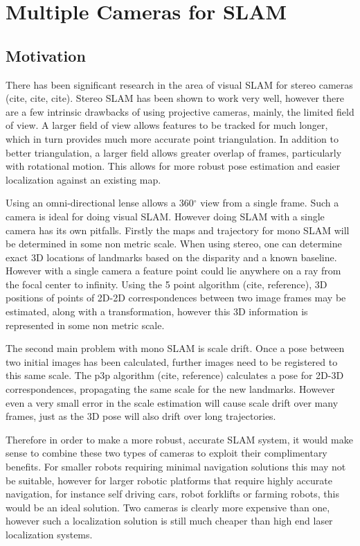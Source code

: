 \chapter{Multiple Cameras for SLAM}
\label{chapter:MultiCamSLAM}

\section{Motivation}

There has been significant research in the area of visual SLAM for stereo cameras (cite, cite, cite).  Stereo SLAM has been shown to work very well, however there are a few intrinsic drawbacks of using projective cameras, mainly, the limited field of view.  A larger field of view allows features to be tracked for much longer, which in turn provides much more accurate point triangulation.  In addition to better triangulation, a larger field allows greater overlap of frames, particularly with rotational motion.  This allows for more robust pose estimation and easier localization against an existing map. %

Using an omni-directional lense allows a 360$^{\circ}$ view from a single frame.  Such a camera is ideal for doing visual SLAM.  However doing SLAM with a single camera has its own pitfalls.  Firstly the maps and trajectory for mono SLAM will be determined in some non metric scale.  When using stereo, one can determine exact 3D locations of landmarks based on the disparity and a known baseline.  However with a single camera a feature point could lie anywhere on a ray from the focal center to infinity.  Using the 5 point algorithm (cite, reference), 3D positions of points of 2D-2D correspondences between two image frames may be estimated, along with a transformation, however this 3D information is represented in some non metric scale.

The second main problem with mono SLAM is scale drift.  Once a pose between two initial images has been calculated, further images need to be registered to this same scale.  The p3p algorithm (cite, reference) calculates a pose for 2D-3D correspondences, propagating the same scale for the new landmarks.  However even a very small error in the scale estimation will cause scale drift over many frames, just as the 3D pose will also drift over long trajectories.

Therefore in order to make a more robust, accurate SLAM system, it would make sense to combine these two types of cameras to exploit their complimentary benefits.  For smaller robots requiring minimal navigation solutions this may not be suitable, however for larger robotic platforms that require highly accurate navigation, for instance self driving cars, robot forklifts or farming robots, this would be an ideal solution.  Two cameras is clearly more expensive than one, however such a localization solution is still much cheaper than high end laser localization systems.

